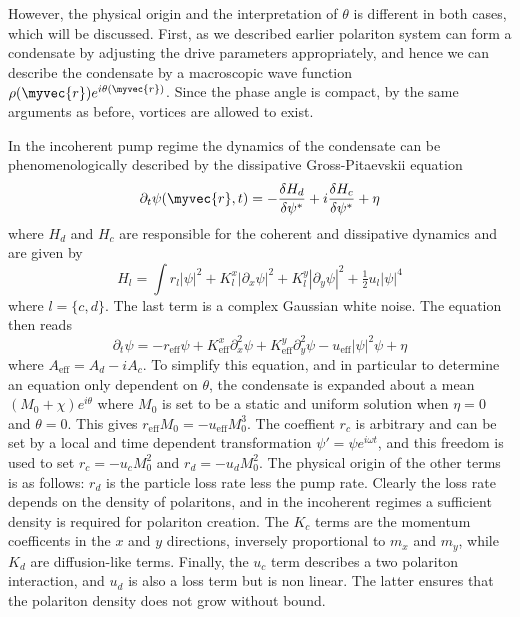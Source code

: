 However, the physical origin and the interpretation of $\theta$ is different in both cases, which will be discussed. First, as we described earlier polariton system can form a condensate by adjusting the drive parameters appropriately, and hence we can describe the condensate by a macroscopic wave function $\rho(\myvec{r})e^{i \theta(\myvec{r})}$. Since the phase angle is compact, by the same arguments as before, vortices are allowed to exist. 

In the incoherent pump regime the dynamics of the condensate can be phenomenologically described by the dissipative Gross-Pitaevskii equation 
\[
\partial_t \psi(\myvec{r}, t) = - \frac{\delta H_d}{\delta \psi^*} + i\frac{\delta H_c}{\delta \psi^*} + \eta
\]
where $H_d$ and $H_c$ are responsible for the coherent and dissipative dynamics and are given by 
\[
H_l = \int r_l |\psi|^2 + K_l^x|\partial_x \psi|^2 + K_l^y|\partial_y \psi|^2 + \tfrac12 u_l |\psi|^4
\]
where $l=\{c, d\}$. The last term is a complex Gaussian white noise. The equation then reads
\[
\partial_t \psi = -r_\text{eff}\psi +K^x_{\text{eff}}\partial_x^2\psi +K^y_{\text{eff}}\partial_y^2\psi -u_{\text{eff}}|\psi|^2\psi + \eta
\]
where $A_{\text{eff}} = A_d -iA_c.$ To simplify this equation, and in particular to determine an equation only dependent on $\theta$, the condensate is expanded about a mean $(M_0 + \chi)e^{i\theta}$ where $M_0$ is set to be a static and uniform solution when $\eta = 0$ and $\theta=0$. This gives $r_{\text{eff}}M_0 = -u_{\text{eff}}M_0^3$. The coeffient $r_c$ is arbitrary and can be set by a local and time dependent transformation $\psi' = \psi e^{i \omega t}$, and this freedom is used to set $r_c = -u_cM_0^2$ and $r_d = -u_dM_0^2$. The physical origin of the other terms is as follows: $r_d$ is the particle loss rate less the pump rate. Clearly the loss rate depends on the density of polaritons, and in the incoherent regimes a sufficient density is required for polariton creation. The $K_c$ terms are the momentum coefficents in the $x$ and $y$ directions, inversely proportional to $m_x$ and $m_y$, while $K_d$ are diffusion-like terms. Finally, the $u_c$ term describes a two polariton interaction, and $u_d$ is also a loss term but is non linear. The latter ensures that the polariton density does not grow without bound. 

